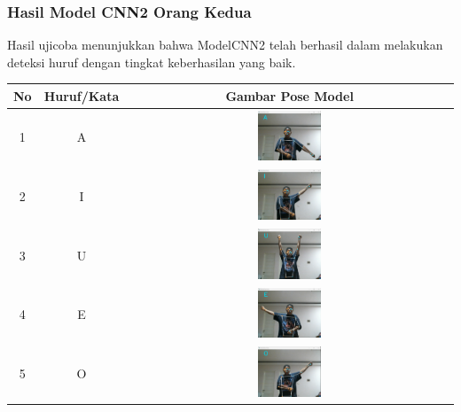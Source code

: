 \subsubsection*{Hasil Model CNN2 Orang Kedua}

Hasil ujicoba menunjukkan bahwa ModelCNN2 telah berhasil dalam melakukan deteksi huruf dengan tingkat keberhasilan yang baik.

	\begin{table}[h]
		\centering
		\label{tbl:Tabel Contoh Huruf/Kata dan Gambar Pose Model CNN2 Orang Kedua}
		\begin{tabular}{|c|c|c|}
		\hline
		No & Huruf/Kata & Gambar Pose Model  \\
		\hline
		1 & A & \includegraphics[width=0.2\textwidth]{gambar/bener/HurufA_ModelCNN2_Fachry.png} \\
		\hline
		2 & I & \includegraphics[width=0.2\textwidth]{gambar/bener/HurufI_ModelCNN2_Fachry.png} \\
		\hline
		3 & U & \includegraphics[width=0.2\textwidth]{gambar/bener/HurufU_ModelCNN2_Fachry.png} \\
		\hline
		4 & E & \includegraphics[width=0.2\textwidth]{gambar/bener/HurufE_ModelCNN2_Fachry.png} \\
		\hline
		5 & O & \includegraphics[width=0.2\textwidth]{gambar/bener/HurufO_ModelCNN2_Fachry.png} \\

\end{tabular}
\end{table}
